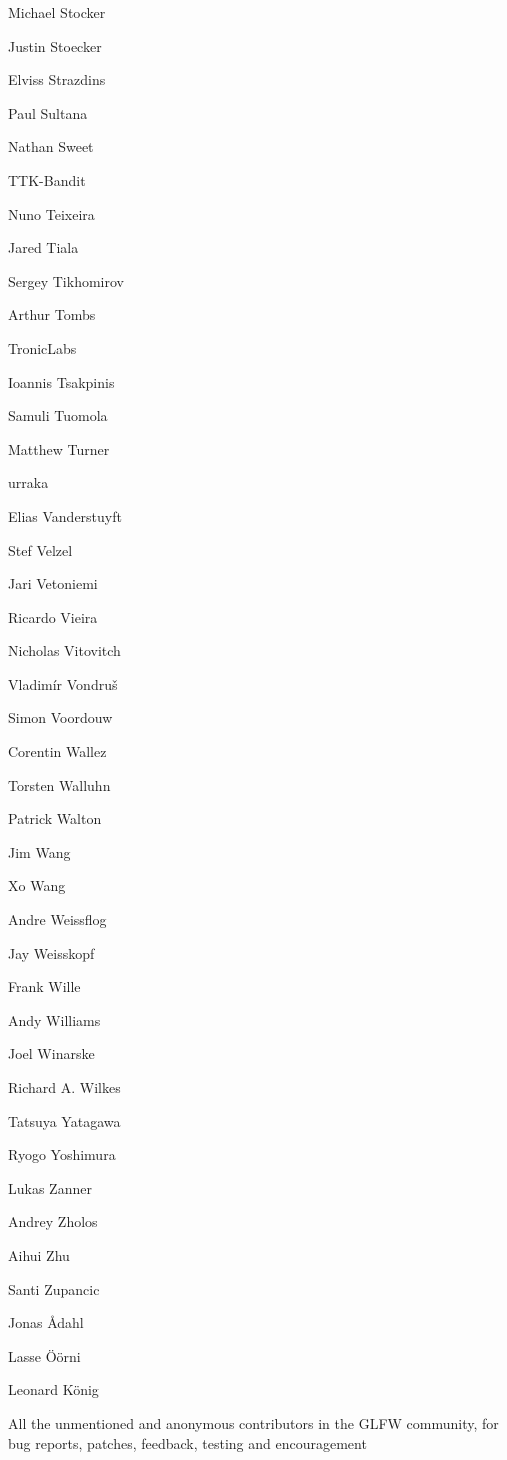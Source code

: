 \begin{DoxyItemize}
\item Michael Stocker
\item Justin Stoecker
\item Elviss Strazdins
\item Paul Sultana
\item Nathan Sweet
\item TTK-\/\+Bandit
\item Nuno Teixeira
\item Jared Tiala
\item Sergey Tikhomirov
\item Arthur Tombs
\item Tronic\+Labs
\item Ioannis Tsakpinis
\item Samuli Tuomola
\item Matthew Turner
\item urraka
\item Elias Vanderstuyft
\item Stef Velzel
\item Jari Vetoniemi
\item Ricardo Vieira
\item Nicholas Vitovitch
\item Vladimír Vondruš
\item Simon Voordouw
\item Corentin Wallez
\item Torsten Walluhn
\item Patrick Walton
\item Jim Wang
\item Xo Wang
\item Andre Weissflog
\item Jay Weisskopf
\item Frank Wille
\item Andy Williams
\item Joel Winarske
\item Richard A. Wilkes
\item Tatsuya Yatagawa
\item Ryogo Yoshimura
\item Lukas Zanner
\item Andrey Zholos
\item Aihui Zhu
\item Santi Zupancic
\item Jonas Ådahl
\item Lasse Öörni
\item Leonard König
\item All the unmentioned and anonymous contributors in the GLFW community, for bug reports, patches, feedback, testing and encouragement 
\end{DoxyItemize}